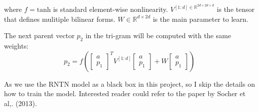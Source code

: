 where $f = \textrm{tanh}$ is standard element-wise nonlinearity. $V^{[1:d] \in \mathbb{R}^{2d \times 2d \times d}}$ is the tensor that defines mulitiple bilinear forms. $W \in \mathbb{R}^{d \times 2d}$ is the main parameter to learn. 

The next parent vector $p_2$ in the tri-gram will be computed with the same weights:
\begin{equation*}
p_2 = f \left(  
\begin{bmatrix}
a \\ p_1
\end{bmatrix}^T
V^{[1:d]} 
\begin{bmatrix}
a \\ p_1
\end{bmatrix}
+ W
\begin{bmatrix}
a \\ p_1
\end{bmatrix}
 \right)
\end{equation*}

As we use the RNTN model as a black box in this project, so I skip the details on how to train the model. Interested reader could refer to the paper by Socher et al,. (2013). 






